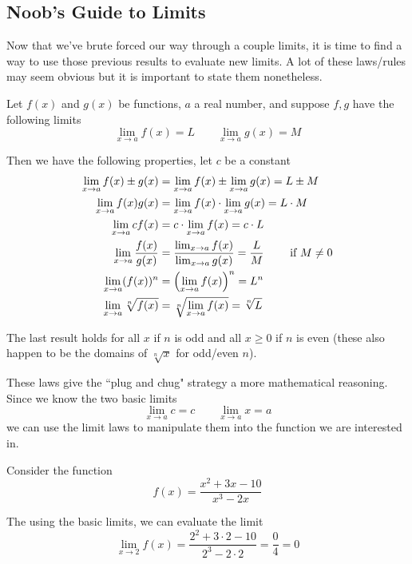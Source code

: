 \newpage 
\subsection{Noob's Guide to Limits}

Now that we've brute forced our way through a couple limits, it is time to find a way to use those previous results to evaluate new limits. A lot of these laws/rules may seem obvious but it is important to state them nonetheless.

\begin{theorem}
	Let $f(x)$ and $g(x)$ be functions, $a$ a real number, and suppose $f,g$ have the following limits
	\[ \lim_{x \to a} f(x) = L \qquad \lim_{x \to a} g(x) = M \]
	
	Then we have the following properties, let $c$ be a constant
	\begin{align*}
		\lim_{x \to a} f(x) \pm g(x) &= \lim_{x \to a} f(x) \pm \lim_{x \to a} g(x) = L \pm M \\
		\lim_{x \to a} f(x)g(x) &= \lim_{x \to a} f(x) \cdot \lim_{x \to a} g(x) = L \cdot M \\
		\lim_{x \to a} cf(x) &= c \cdot \lim_{x \to a} f(x) = c \cdot L \\
		\lim_{x \to a} \frac{f(x)}{g(x)} &= \frac{\lim_{x \to a} f(x)}{\lim_{x \to a} g(x)} = \frac{L}{M} \qquad \text{ if $M \neq 0$} \\
		\lim_{x \to a} (f(x))^n &= \qty(\lim_{x \to a} f(x))^n = L^n \\
		\lim_{x \to a} \sqrt[n]{f(x)} &= \sqrt[n]{\lim_{x \to a} f(x)} = \sqrt[n]{L}
	\end{align*}
	
	The last result holds for all $x$ if $n$ is odd and all $x \geq 0$ if $n$ is even (these also happen to be the domains of $\sqrt[n]{x}$ for odd/even $n$).
\end{theorem}

These laws give the ``plug and chug" strategy a more mathematical reasoning. Since we know the two basic limits
\[ \lim_{x \to a} c = c \qquad \lim_{x \to a} x = a \]
we can use the limit laws to manipulate them into the function we are interested in. 

\begin{example}
	Consider the function
	\[ f(x) = \frac{x^2 + 3x - 10}{x^3 - 2x} \]
	
	The using the basic limits, we can evaluate the limit
	\[ \lim_{x \to 2} f(x) = \frac{2^2 + 3 \cdot 2 - 10}{2^3 - 2 \cdot 2} = \frac{0}{4} = 0 \]
\end{example}

